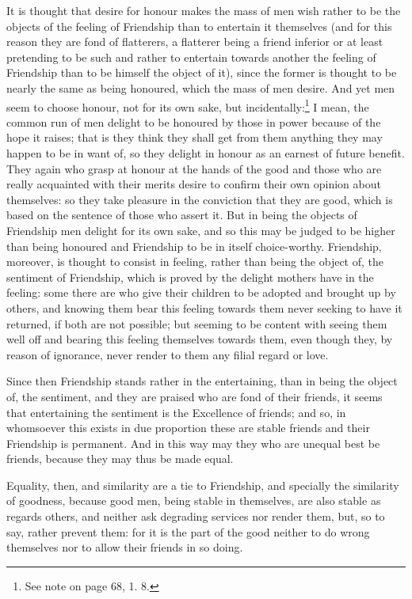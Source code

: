It is thought that desire for honour makes the mass of men wish rather to be
the objects of the feeling of Friendship than to entertain it themselves (and
for this reason they are fond of flatterers, a flatterer being a friend
inferior or at least pretending to be such and rather to entertain towards
another the feeling of Friendship than to be himself the object of it), since
the former is thought to be nearly the same as being honoured, which the mass
of men desire. And yet men seem to choose honour, not for its own sake, but
incidentally:\footnote{See note on page 68, 1. 8.}
I mean, the common run of men delight to be honoured by those in power because
of the hope it raises; that is they think they shall get from them anything
they may happen to be in want of, so they delight in honour as an earnest of
future benefit. They again who grasp at honour at the hands of the good and
those who are really acquainted with their merits desire to confirm their own
opinion about themselves: so they take pleasure in the conviction that they are
good, which is based on the sentence of those who assert it. But in being the
objects of Friendship men delight for its own sake, and so this may be judged
to be higher than being honoured and Friendship to be in itself choice-worthy.
Friendship, moreover, is thought to consist in feeling, rather than being the
object of, the sentiment of Friendship, which is proved by the delight mothers
have in the feeling: some there are who give their children to be adopted and
brought up by others, and knowing them bear this feeling towards them never
seeking to have it returned, if both are not possible; but seeming to be
content with seeing them well off and bearing this feeling themselves towards
them, even though they, by reason of ignorance, never render to them any filial
regard or love.

Since then Friendship stands rather in the entertaining, than in being the
object of, the sentiment, and they are praised who are fond of their friends,
it seems that entertaining the sentiment is the Excellence of friends; and so,
in whomsoever this exists in due proportion these are stable friends and their
Friendship is permanent. And in this way may they who are unequal best be
friends, because they may thus be made equal.

Equality, then, and similarity are a tie to Friendship, and specially the
similarity of goodness, because good men, being stable in themselves, are also
stable as regards others, and neither ask degrading services nor render them,
but, so to say, rather prevent them: for it is the part of the good neither to
do wrong themselves nor to allow their friends in so doing.

